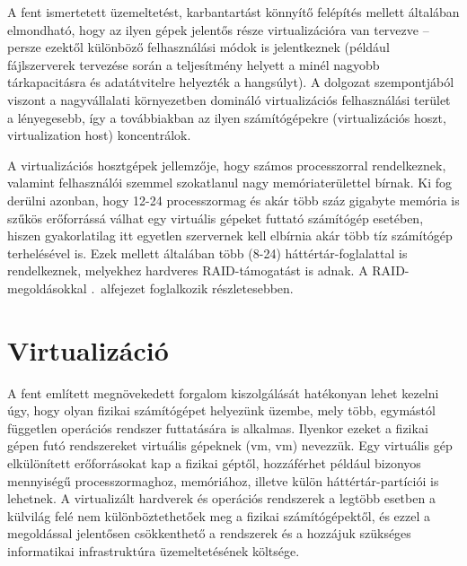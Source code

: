 A fent ismertetett üzemeltetést, karbantartást könnyítő felépítés mellett általában elmondható, hogy az ilyen gépek jelentős része virtualizációra van tervezve -- persze ezektől különböző felhasználási módok is jelentkeznek (például fájlszerverek tervezése során a teljesítmény helyett a minél nagyobb tárkapacitásra és adatátvitelre helyezték a hangsúlyt). A dolgozat szempontjából viszont a nagyvállalati környezetben domináló virtualizációs felhasználási terület a lényegesebb, így a továbbiakban az ilyen számítógépekre (virtualizációs hoszt, virtualization host) koncentrálok.

A virtualizációs hosztgépek jellemzője, hogy számos processzorral rendelkeznek, valamint felhasználói szemmel szokatlanul nagy memóriaterülettel bírnak. Ki fog derülni azonban, hogy 12-24 processzormag és akár több száz gigabyte memória is szűkös erőforrássá válhat egy virtuális gépeket futtató számítógép esetében, hiszen gyakorlatilag itt egyetlen szervernek kell elbírnia akár több tíz számítógép terhelésével is. Ezek mellett általában több (8-24) háttértár-foglalattal is rendelkeznek, melyekhez hardveres RAID-támogatást is adnak. A RAID-megoldásokkal .~alfejezet foglalkozik részletesebben.

\section{Virtualizáció}
A fent említett megnövekedett forgalom kiszolgálását hatékonyan lehet kezelni úgy, hogy olyan fizikai számítógépet helyezünk üzembe, mely  több, egymástól független operációs rendszer futtatására is alkalmas. Ilyenkor ezeket a fizikai gépen futó rendszereket virtuális gépeknek (\acrlong{vm}, \acrshort{vm}) nevezzük. Egy virtuális gép elkülönített erőforrásokat kap a fizikai géptől, hozzáférhet például bizonyos mennyiségű processzormaghoz, memóriához, illetve külön háttértár-partíciói is lehetnek. A virtualizált hardverek és operációs rendszerek a legtöbb esetben a külvilág felé nem különböztethetőek meg a fizikai számítógépektől, és ezzel a megoldással jelentősen csökkenthető a rendszerek és a hozzájuk szükséges informatikai infrastruktúra üzemeltetésének költsége.


